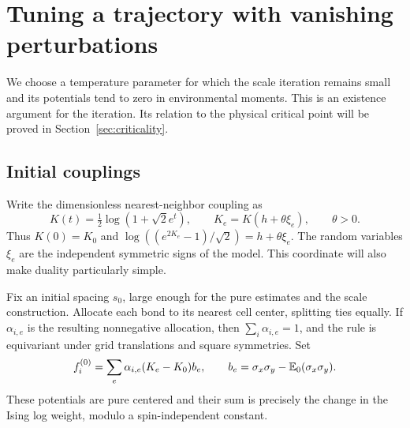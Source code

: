 \section{Tuning a trajectory with vanishing perturbations}
\label{sec:trajectory}

We choose a temperature parameter for which the scale iteration remains
small and its potentials tend to zero in environmental moments.  This
is an existence argument for the iteration.  Its relation to the physical
critical point will be proved in Section~\ref{sec:criticality}.

\subsection{Initial couplings}

Write the dimensionless nearest-neighbor coupling as
\begin{equation}
 K(t)=\tfrac12\log(1+\sqrt2 e^t),\qquad
 K_e=K(h+\theta\xi_e),
 \qquad \theta>0.
 \label{traj:couplings}
\end{equation}
Thus $K(0)=K_0$ and
$\log((e^{2K_e}-1)/\sqrt2)=h+\theta\xi_e$.
The random variables $\xi_e$ are the independent symmetric signs of
the model.  This coordinate will also make duality particularly simple.

Fix an initial spacing $s_0$, large enough for the pure estimates and
the scale construction.  Allocate each bond to its nearest cell
center, splitting ties equally.  If $\alpha_{i,e}$ is the resulting
nonnegative allocation, then $\sum_i\alpha_{i,e}=1$, and the rule is
equivariant under grid translations and square symmetries.  Set
\begin{equation}
 f_i^{(0)}=\sum_e\alpha_{i,e}(K_e-K_0)b_e,
 \qquad b_e=\sigma_x\sigma_y-\mathbb E_0(\sigma_x\sigma_y).
 \label{traj:initial-potentials}
\end{equation}
These potentials are pure centered and their sum is precisely the
change in the Ising log weight, modulo a spin-independent constant.

